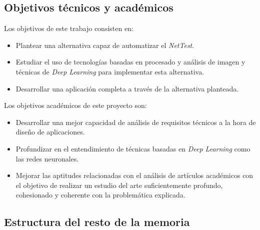\subsection{Objetivos técnicos y académicos}
Los objetivos de este trabajo consisten en:

\begin{itemize}
    \item Plantear una alternativa capaz de automatizar el \textit{NetTest}.
    \item Estudiar el uso de tecnologías basadas en procesado y análisis de imagen y técnicas de \textit{Deep Learning} para implementar esta alternativa.
    \item Desarrollar una aplicación completa a través de la alternativa planteada.
\end{itemize}

Los objetivos académicos de este proyecto son:

\begin{itemize}
    \item Desarrollar una mejor capacidad de análisis de requisitos técnicos a la hora de diseño de aplicaciones.
    \item Profundizar en el entendimiento de técnicas basadas en \textit{Deep Learning} como las redes neuronales.
    \item Mejorar las aptitudes relacionadas con el análisis de artículos académicos con el objetivo de realizar un estudio del arte suficientemente profundo, cohesionado y coherente con la problemática explicada.
\end{itemize}


\subsection{Estructura del resto de la memoria}
